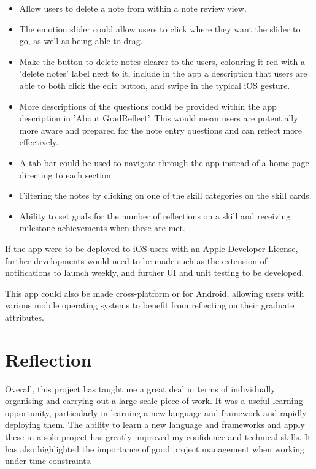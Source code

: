 \documentclass{l4proj}
\begin{document}
\begin{itemize}
    \item Allow users to delete a note from within a note review view.
    \item The emotion slider could allow users to click where they want the slider to go, as well as being able to drag.
    \item Make the button to delete notes clearer to the users, colouring it red with a 'delete notes' label next to it, include in the app a description that users are able to both click the edit button, and swipe in the typical iOS gesture.
    \item More descriptions of the questions could be provided within the app description in 'About GradReflect'. This would mean users are potentially more aware and prepared for the note entry questions and can reflect more effectively.
    \item A tab bar could be used to navigate through the app instead of a home page directing to each section.
    \item Filtering the notes by clicking on one of the skill categories on the skill cards.
    \item Ability to set goals for the number of reflections on a skill and receiving milestone achievements when these are met.
\end{itemize}

If the app were to be deployed to iOS users with an Apple Developer License, further developments would need to be made such as the extension of notifications to launch weekly, and further UI and unit testing to be developed. 

This app could also be made cross-platform or for Android, allowing users with various mobile operating systems to benefit from reflecting on their graduate attributes.

\section{Reflection}

Overall, this project has taught me a great deal in terms of individually organising and carrying out a large-scale piece of work. It was a useful learning opportunity, particularly in learning a new language and framework and rapidly deploying them. The ability to learn a new language and frameworks and apply these in a solo project has greatly improved my confidence and technical skills. It has also highlighted the importance of good project management when working under time constraints. 
\end{document}
